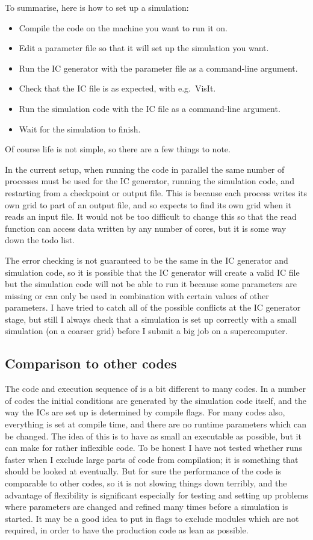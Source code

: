 \documentclass[a4paper,11pt]{report}
\begin{document}
To summarise, here is how to set up a simulation:
\begin{itemize}
\item Compile the code on the machine you want to run it on.
\item Edit a parameter file so that it will set up the simulation you want.
\item Run the IC generator with the parameter file as a command-line argument.
\item Check that the IC file is as expected, with e.g.\ VisIt.
\item Run the simulation code with the IC file as a command-line argument.
\item Wait for the simulation to finish.
\end{itemize}

Of course life is not simple, so there are a few things to note.

In the current setup, when running the code in parallel the same number of processes must be used for the IC generator, running the simulation code, and restarting from a checkpoint or output file.
This is because each process writes its own grid to part of an output file, and so expects to find its own grid when it reads an input file.
It would not be too difficult to change this so that the read function can access data written by any number of cores, but it is some way down the todo list.

The error checking is not guaranteed to be the same in the IC generator and simulation code, so it is possible that the IC generator will create a valid IC file but the simulation code will not be able to run it because some parameters are missing or can only be used in combination with certain values of other parameters.
I have tried to catch all of the possible conflicts at the IC generator stage, but still I always check that a simulation is set up correctly with a small simulation (on a coarser grid) before I submit a big job on a supercomputer.

\subsection{Comparison to other codes}
The code and execution sequence of \pion{} is a bit different to many codes.
In a number of codes the initial conditions are generated by the simulation code itself, and the way the ICs are set up is determined by compile flags.
For many codes also, everything is set at compile time, and there are no runtime parameters which can be changed.
The idea of this is to have as small an executable as possible, but it can make for rather inflexible code.
To be honest I have not tested whether \pion{} runs faster when I exclude large parts of code from compilation; it is something that should be looked at eventually.
But for sure the performance of the code is comparable to other codes, so it is not slowing things down terribly, and the advantage of flexibility is significant especially for testing and setting up problems where parameters are changed and refined many times before a simulation is started.
It may be a good idea to put in flags to exclude modules which are not required, in order to have the production code as lean as possible.
\end{document}

